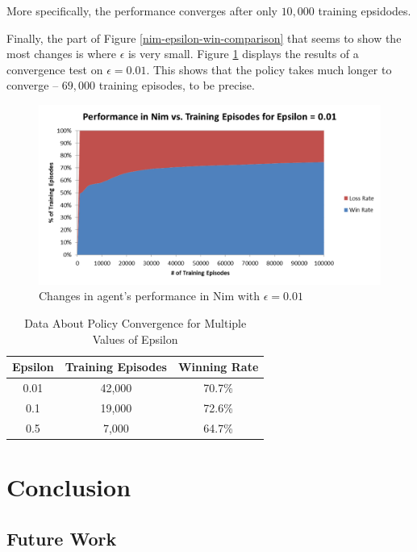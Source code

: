 \documentclass[11pt,a4paper]{report}
\begin{document}
More specifically, the performance converges after only $10,000$ training epsidodes.

Finally, the part of Figure \ref{nim-epsilon-win-comparison} that seems to show the most changes is where $\epsilon$ is very small. Figure \ref{nim-0-01-convergence} displays the results of a convergence test on $\epsilon = 0.01$. This shows that the policy takes much longer to converge -- $69,000$ training episodes, to be precise.

\begin{figure}[htbp]
	\begin{center}
		\includegraphics[width=125mm]{Nim_PerformanceResults_0_01.png}
		\caption{Changes in agent's performance in Nim with $\epsilon = 0.01$}
		\label{nim-0-01-convergence}
	\end{center}
\end{figure}

\begin{table}[ht]
	\centering
	\begin{tabular}{c c c}
		Epsilon & Training Episodes & Winning Rate \\
		\hline
		0.01 & 42,000 & 70.7\% \\
		0.1  & 19,000 & 72.6\% \\
		0.5 & 7,000 & 64.7\% \\
	\end{tabular}
	\caption{Data About Policy Convergence for Multiple Values of Epsilon}
	\label{table:nim_convergence_table}
\end{table}


\chapter{Conclusion}


\section{Future Work}
\end{document}
